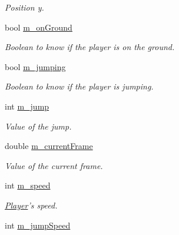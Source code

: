 \begin{DoxyCompactItemize}
\begin{DoxyCompactList}\small\item\em Position y. \end{DoxyCompactList}\item 
\hypertarget{class_player_a4f3be31c677f7c86cd838381b418d440}{bool \hyperlink{class_player_a4f3be31c677f7c86cd838381b418d440}{m\-\_\-on\-Ground}}\label{class_player_a4f3be31c677f7c86cd838381b418d440}

\begin{DoxyCompactList}\small\item\em Boolean to know if the player is on the ground. \end{DoxyCompactList}\item 
\hypertarget{class_player_a38b5de5aa041c1766c572c046feb0f08}{bool \hyperlink{class_player_a38b5de5aa041c1766c572c046feb0f08}{m\-\_\-jumping}}\label{class_player_a38b5de5aa041c1766c572c046feb0f08}

\begin{DoxyCompactList}\small\item\em Boolean to know if the player is jumping. \end{DoxyCompactList}\item 
\hypertarget{class_player_a87196b22a09b01735cfc6e0eb3a4ad62}{int \hyperlink{class_player_a87196b22a09b01735cfc6e0eb3a4ad62}{m\-\_\-jump}}\label{class_player_a87196b22a09b01735cfc6e0eb3a4ad62}

\begin{DoxyCompactList}\small\item\em Value of the jump. \end{DoxyCompactList}\item 
\hypertarget{class_player_aa1f75eb3abbb09f12c21f071a2b13b95}{double \hyperlink{class_player_aa1f75eb3abbb09f12c21f071a2b13b95}{m\-\_\-current\-Frame}}\label{class_player_aa1f75eb3abbb09f12c21f071a2b13b95}

\begin{DoxyCompactList}\small\item\em Value of the current frame. \end{DoxyCompactList}\item 
\hypertarget{class_player_a3b350d804ed50bf5acdc5069a98e7a8a}{int \hyperlink{class_player_a3b350d804ed50bf5acdc5069a98e7a8a}{m\-\_\-speed}}\label{class_player_a3b350d804ed50bf5acdc5069a98e7a8a}

\begin{DoxyCompactList}\small\item\em \hyperlink{class_player}{Player}'s speed. \end{DoxyCompactList}\item 
\hypertarget{class_player_ac89446b6b822013a15388a5536bc2a36}{int \hyperlink{class_player_ac89446b6b822013a15388a5536bc2a36}{m\-\_\-jump\-Speed}}\label{class_player_ac89446b6b822013a15388a5536bc2a36}


\end{DoxyCompactItemize}
